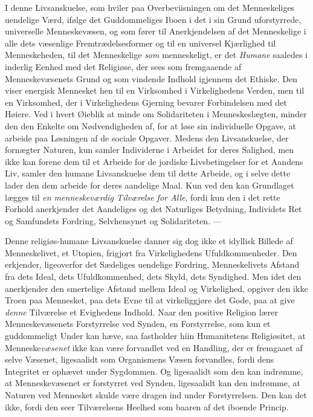 \documentclass[12pt,a4paper,openany]{book}
\newcommand{\opage}[1]{\marginnote{\footnotesize\textit{[#1]}}}
\begin{document}
I denne Livsanskuelse, som hviler paa Overbeviisningen
om det Menneskeliges uendelige Værd, ifølge det Guddommeliges
Iboen i det i sin Grund uforstyrrede, universelle
Menneskevæsen, og som fører til Anerkjendelsen af det
Menneskelige i alle dets væsenlige Fremtrædelsesformer og
til en universel Kjærlighed til Menneskeheden, til det Menneskelige
\emph{som} menneskeligt, er det \emph{Humane} saaledes i inderlig
Eenhed med det Religiøse, der sees som fremgaaende af
Menneskevæsenets Grund og som vindende Indhold igjennem
det Ethiske. Den viser energisk Mennesket hen til en Virksomhed
i Virkelighedens Verden, men til en Virksomhed, der
i Virkelighedens Gjerning bevarer Forbindelsen med det
Høiere. Ved i hvert Øieblik at minde om Solidariteten i
Menneskeslægten, minder den den Enkelte om Nødvendigheden
af, for at løse sin individuelle Opgave, at arbeide paa Løsningen
af de sociale Opgaver. Medens den Livsanskuelse,
der fornægter Naturen, kun samler Individerne i Arbeidet
for deres Salighed, men ikke kan forene dem til et Arbeide
for de jordiske Livsbetingelser for et Aandens Liv, samler
\opage{505}den humane Livsanskuelse dem til dette Arbeide, og i selve
dette lader den dem arbeide for deres aandelige Maal. Kun
ved den kan Grundlaget lægges til \emph{en menneskeværdig
Tilværelse for Alle}, fordi kun den i det rette Forhold
anerkjender det Aandeliges og det Naturliges Betydning,
Individets Ret og Samfundets Fordring, Selvhensynet og
Solidariteten. —

Denne religiøs-humane Livsanskuelse danner sig dog ikke
et idyllisk Billede af Menneskelivet, et Utopien, frigjort fra
Virkelighedens Ufuldkommenheder. Den erkjender, ligeoverfor
det Sædeliges uendelige Fordring, Menneskelivets Afstand
fra dets Ideal, dets Ufuldkommenhed, dets Skyld, dets
Syndighed. Men idet den anerkjender den smertelige Afstand
mellem Ideal og Virkelighed, opgiver den ikke Troen paa
Mennesket, paa dets Evne til at virkeliggjøre det Gode, paa
at give \emph{denne} Tilværelse et Evighedens Indhold. Naar
den positive Religion lærer Menneskevæsenets Forstyrrelse
ved Synden, en Forstyrrelse, som kun et guddommeligt Under
kan hæve, saa fastholder hiin Humanitetens Religiøsitet, at
Menneske\emph{væsenet} ikke kan være forvandlet ved en Handling,
der er fremgaaet af selve Væsenet, ligesaalidt som Organismens
Væsen forvandles, fordi dens Integritet er ophævet
under Sygdommen. Og ligesaalidt som den kan indrømme,
at Menneskevæsenet er forstyrret ved Synden, ligesaalidt kan
den indrømme, at Naturen ved Mennesket skulde være dragen
ind under Forstyrrelsen. Den kan det ikke, fordi den seer
Tilværelsens Heelhed som baaren af det iboende Princip.
\end{document}
